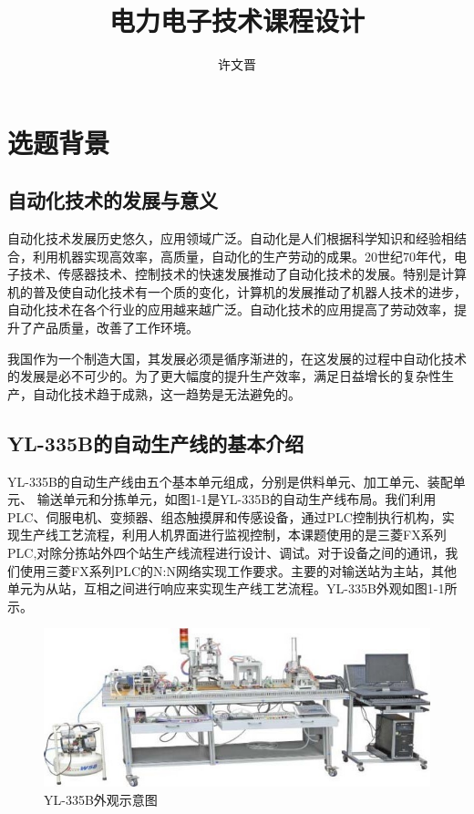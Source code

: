 \documentclass[12pt]{article}
\title{电力电子技术课程设计}
\author{许文晋}
\begin{document}
\tableofcontents
\pagebreak
{}

\section{选题背景}
\subsection{自动化技术的发展与意义}
自动化技术发展历史悠久，应用领域广泛。自动化是人们根据科学知识和经验相结合，利用机器实现高效率，高质量，自动化的生产劳动的成果。20世纪70年代，电子技术、传感器技术、控制技术的快速发展推动了自动化技术的发展。特别是计算机的普及使自动化技术有一个质的变化，计算机的发展推动了机器人技术的进步，自动化技术在各个行业的应用越来越广泛。自动化技术的应用提高了劳动效率，提升了产品质量，改善了工作环境。

我国作为一个制造大国，其发展必须是循序渐进的，在这发展的过程中自动化技术的发展是必不可少的。为了更大幅度的提升生产效率，满足日益增长的复杂性生产，自动化技术趋于成熟，这一趋势是无法避免的。

\subsection{YL-335B的自动生产线的基本介绍}
YL-335B的自动生产线由五个基本单元组成，分别是供料单元、加工单元、装配单元、 输送单元和分拣单元，如图1-1是YL-335B的自动生产线布局。我们利用PLC、伺服电机、变频器、组态触摸屏和传感设备，通过PLC控制执行机构，实现生产线工艺流程，利用人机界面进行监视控制，本课题使用的是三菱FX系列PLC,对除分拣站外四个站生产线流程进行设计、调试。对于设备之间的通讯，我们使用三菱FX系列PLC的N:N网络实现工作要求。主要的对输送站为主站，其他单元为从站，互相之间进行响应来实现生产线工艺流程。YL-335B外观如图1-1所示。
\begin{figure}[htbp]
    \centering
    \includegraphics[scale=0.8]{fig/1-1.jpg}
    \caption{YL-335B外观示意图}
\end{figure} 
\end{document}
